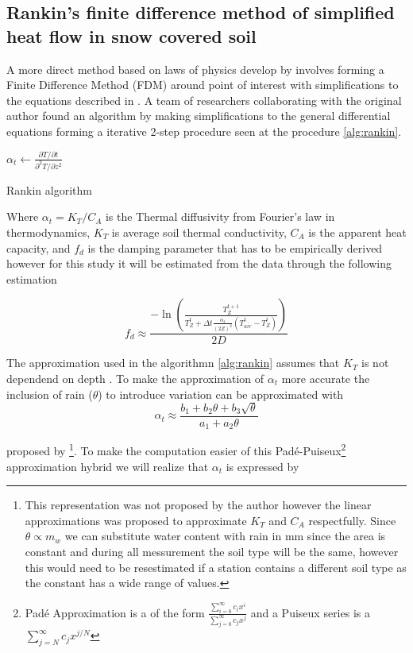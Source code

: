\subsection[Rankin algorithm]{Rankin's finite difference method of simplified heat flow in snow covered soil}\label{sec:theory:rankin}

A more direct method based on laws of physics develop by \citeauthor{karvonen_model_1988} involves forming a Finite Difference Method (FDM) around point of interest with simplifications to the equations described in . A team of researchers collaborating with the original author found an algorithm by making simplifications to the general differential equations forming a iterative 2-step procedure seen at the procedure \ref{alg:rankin}.

\begin{algorithm}[h]
	\SetAlgoLined
	$\alpha_t \gets \frac{\partial T / \partial t}{\partial^2 T / \partial z^2}$\;
	\caption{Rankin algorithm}
	\label{alg:rankin}
\end{algorithm}

Where $\alpha_t = K_T/C_A$ is the Thermal diffusivity from Fourier's law in thermodynamics, $K_T$ is average soil thermal conductivity, $C_A$ is the apparent heat capacity, and $f_d$ is the damping parameter that has to be empirically derived however for this study it will be estimated from the data through the following estimation

$$
f_d \approx \frac{-\ln\left(\frac{T_Z^{t+1}}{T_Z^t + \Delta t \frac{\alpha_t}{(2Z)^2} (T^t_{air}-T_Z^t)}\right)}{2D}
$$

The approximation used in the algorithmn \ref{alg:rankin} assumes that $K_T$ is not dependend on depth . To make the approximation of $\alpha_t$ more accurate the inclusion of rain ($\theta$) to introduce variation can be approximated with
$$
\alpha_t \approx \frac{b_1 + b_2\theta +b_3\sqrt{\theta}}{a_1 + a_2\theta}
$$

proposed by \citeauthor{kodesova_thermal_2013}\cite{kodesova_thermal_2013}\footnote{This representation was not proposed by the author however the linear approximations was proposed to approximate $K_T$ and $C_A$ respectfully. Since $\theta \propto m_w$ we can substitute water content with rain in mm since the area is constant and during all messurement the soil type will be the same, however this would need to be resestimated if a station contains a different soil type as the constant has a wide range of values\cite{kodesova_thermal_2013}.}. To make the computation easier of this Padé-Puiseux\footnote{Padé Approximation is a of the form $\frac{\sum_{i=0}^\infty c_ix^i}{\sum_{j=0}^\infty c_jx^j}$ and a Puiseux series is a $\sum_{j=N}^\infty c_jx^{j/N}$} approximation hybrid we will realize that $\alpha_t$ is expressed by

